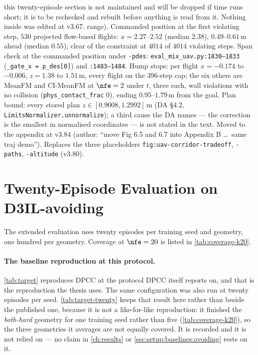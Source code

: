 \begin{deadblock}{this twenty-episode section is not maintained and will be dropped if time runs short; it
is to be rechecked and rebuilt before anything is read from it. Nothing inside was edited at v3.67.}
{range). Commanded position at the first violating step, $530$ projected flow-based flights: $x=2.27$--$2.52$
(median $2.38$), $0.49$--$0.61$\,m ahead (median $0.55$); clear of the constraint at $4014$ of $4014$
violating steps. Span check at the commanded position under \texttt{-pdes}:
\texttt{eval\_mix\_uav.py:1830--1833} (\texttt{\_gate\_x = p\_des[0]}) and \texttt{:1483--1484}. Hump
stops: per flight $x=-0.174$ to $-0.006$, $z=1.38$ to $1.51$\,m, every flight on the $396$-step cap; the six
others are MeanFM and CI-MeanFM at $\nfe=2$ under $t$, three each, wall violations with no collision
(\texttt{phys\_contact\_frac} $0$), ending $0.95$--$1.79$\,m from the goal. Plan bound: every stored plan
$z\in[0.9008,1.2992]$\,m (DA \S4.2, \texttt{LimitsNormalizer.unnormalize}); a third cause the DA names ---
the correction is the smallest in normalised coordinates --- is not stated in the text. Moved to the appendix at v3.84 (author: \enquote{move Fig 6.5 and 6.7 into Appendix B \ldots\ same traj demo}). Replaces the
three placeholders \texttt{fig:uav-corridor-tradeoff}, \texttt{-paths}, \texttt{-altitude} (v3.80).}

\FloatBarrier

\section{Twenty-Episode Evaluation on D3IL-avoiding}\label{app:avoiding-twenty-episode}

The extended evaluation uses twenty episodes per training seed and geometry, one hundred per geometry.
Coverage at $\nfe=20$ is listed in \autoref{tab:coverage-k20}.

\paragraph{The baseline reproduction at this protocol.}
\autoref{tab:target} reproduces \ac{DPCC} at the protocol \ac{DPCC} itself reports on, and that is the
reproduction the thesis uses. The same configuration was also run at twenty episodes per seed.
\autoref{tab:target-twenty} keeps that result here rather than beside the published one, because it is not
a like-for-like reproduction: it finished the \emph{both-hard} geometry for one training seed rather than
five (\autoref{tab:coverage-k20}), so the three geometries it averages are not equally covered. It is
recorded and it is not relied on --- no claim in \autoref{ch:results} or
\autoref{sec:setup:baselines:avoiding} rests on it.


\end{deadblock}
